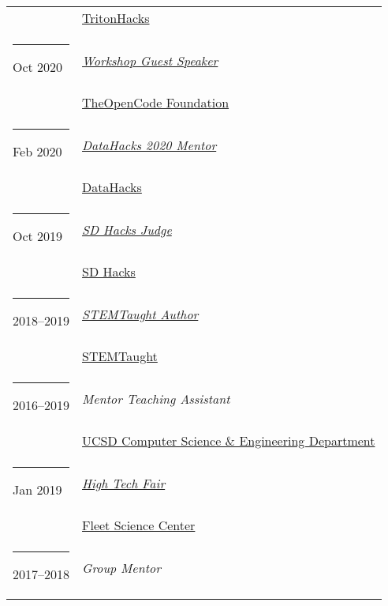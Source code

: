 \documentclass[margin,line]{res}
\begin{document}
\begin{resume}
\begin{longtable}{@{}p{0.7in}p{4in}}
\hspace*{-4mm} & \hspace{4mm} \href{https://www.tritonhacks.org/}{TritonHacks}\\
\hspace*{-4mm} \rule{-1mm}{5mm} Oct 2020 & \href{https://www.theopencode.org/}{\textit{Workshop Guest Speaker}}\\*
\hspace*{-4mm} & \hspace{4mm} \href{https://www.theopencode.org/}{TheOpenCode Foundation}\\
\hspace*{-4mm} \rule{-1mm}{5mm} Feb 2020 & \href{http://datahacks.tech/}{\textit{DataHacks 2020 Mentor}}\\*
\hspace*{-4mm} & \hspace{4mm} \href{http://datahacks.tech/}{DataHacks}\\
\hspace*{-4mm} \rule{-1mm}{5mm} Oct 2019 & \href{https://www.sdhacks.io/}{\textit{SD Hacks Judge}}\\*
\hspace*{-4mm} & \hspace{4mm} \href{https://www.sdhacks.io/}{SD Hacks}\\
\hspace*{-4mm} \rule{-1mm}{5mm} 2018--2019 & \href{https://www.stemtaught.com/writingcontestoverview}{\textit{STEMTaught Author}}\\*
\hspace*{-4mm} & \hspace{4mm} \href{https://www.stemtaught.com/}{STEMTaught}\\
\hspace*{-4mm} \rule{-1mm}{5mm} 2016--2019 & \textit{Mentor Teaching Assistant}\\*
\hspace*{-4mm} & \hspace{4mm} \href{https://cse.ucsd.edu/}{UCSD Computer Science \& Engineering Department}\\
\hspace*{-4mm} \rule{-1mm}{5mm} Jan 2019 & \href{https://www.rhfleet.org/events/high-tech-fair}{\textit{High Tech Fair}}\\*
\hspace*{-4mm} & \hspace{4mm} \href{https://www.rhfleet.org/}{Fleet Science Center}\\
\hspace*{-4mm} \rule{-1mm}{5mm} 2017--2018 & \textit{Group Mentor}\\*

\end{longtable}
\end{resume}
\end{document}
